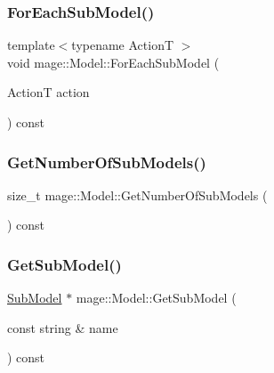 \subsubsection{\texorpdfstring{For\+Each\+Sub\+Model()}{ForEachSubModel()}\hspace{0.1cm}{\footnotesize\ttfamily [2/2]}}
{\footnotesize\ttfamily template$<$typename ActionT $>$ \\
void mage\+::\+Model\+::\+For\+Each\+Sub\+Model (\begin{DoxyParamCaption}\item[{ActionT}]{action }\end{DoxyParamCaption}) const}

\hypertarget{classmage_1_1_model_a29ad2496b11ef5af5f179cfe52943cd3}{}\label{classmage_1_1_model_a29ad2496b11ef5af5f179cfe52943cd3} 
\subsubsection{\texorpdfstring{Get\+Number\+Of\+Sub\+Models()}{GetNumberOfSubModels()}}
{\footnotesize\ttfamily size\+\_\+t mage\+::\+Model\+::\+Get\+Number\+Of\+Sub\+Models (\begin{DoxyParamCaption}{ }\end{DoxyParamCaption}) const}

\hypertarget{classmage_1_1_model_a1cae9eb62a353445d14b5331e88bdeac}{}\label{classmage_1_1_model_a1cae9eb62a353445d14b5331e88bdeac} 
\subsubsection{\texorpdfstring{Get\+Sub\+Model()}{GetSubModel()}}
{\footnotesize\ttfamily \hyperlink{classmage_1_1_sub_model}{Sub\+Model} $\ast$ mage\+::\+Model\+::\+Get\+Sub\+Model (\begin{DoxyParamCaption}\item[{const string \&}]{name }\end{DoxyParamCaption}) const}

\hypertarget{classmage_1_1_model_a319fb9b9d9c673ed9c83325d5bcbdfd7}{}\label{classmage_1_1_model_a319fb9b9d9c673ed9c83325d5bcbdfd7} 
